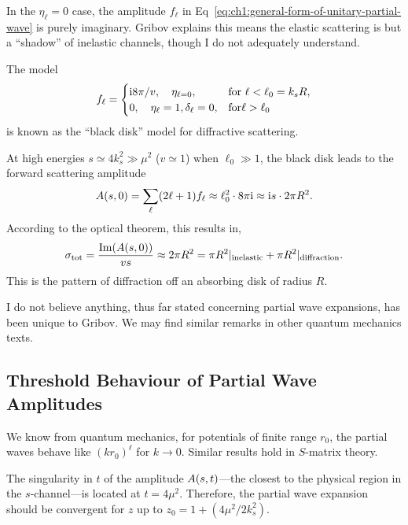 \M
In the $\eta_{\ell}=0$ case, the amplitude $f_{\ell}$ in
Eq~\eqref{eq:ch1:general-form-of-unitary-partial-wave} is purely
imaginary. Gribov explains this means the elastic scattering is but a
``shadow'' of inelastic channels, though I do not adequately understand.

The model
\begin{equation}
  f_{\ell} = \begin{cases}
    \mathrm{i} 8\pi/v,\quad \eta_{\ell=0}, & \mbox{for }\ell<\ell_{0}=k_{s}R,\\
    0,\quad \eta_{\ell}=1,\delta_{\ell}=0, & \mbox{for} \ell>\ell_{0}
  \end{cases}
\end{equation}
is known as the ``black disk'' model for diffractive scattering.

\M
At high energies $s\simeq 4k_{s}^{2}\gg\mu^{2}$ ($v\simeq 1$) when
$\ell_{0}\gg1$, the black disk leads to the forward scattering amplitude
\begin{equation}
A(s,0) = \sum_{\ell}(2\ell+1)f_{\ell}\approx
\ell_{0}^{2}\cdot8\pi\mathrm{i}\approx\mathrm{i} s\cdot 2\pi R^{2}.
\end{equation}
According to the optical theorem, this results in,
\begin{equation}
\sigma_{\text{tot}} = \frac{\operatorname{Im}(A(s,0))}{vs}\approx2\pi R^{2}=\pi R^{2}|_{\text{inelastic}}+\pi
R^{2}|_{\text{diffraction}}.
\end{equation}
This is the pattern of diffraction off an absorbing disk of radius $R$.

I do not believe anything, thus far stated concerning partial wave
expansions, has been unique to Gribov. We may find similar remarks in
other quantum mechanics texts.

\subsection{Threshold Behaviour of Partial Wave Amplitudes}

\M We know from quantum mechanics, for potentials of finite range
$r_{0}$, the partial waves behave like $(kr_{0})^{\ell}$ for $k\to 0$.
Similar results hold in $S$-matrix theory.

\M[1] The singularity in $t$ of the amplitude $A(s,t)$---the
closest to the physical region in the $s$-channel---is located at
$t=4\mu^{2}$. Therefore, the partial wave expansion should be convergent
for $z$ up to $z_{0}=1 + (4\mu^{2}/2k_{s}^{2})$.

